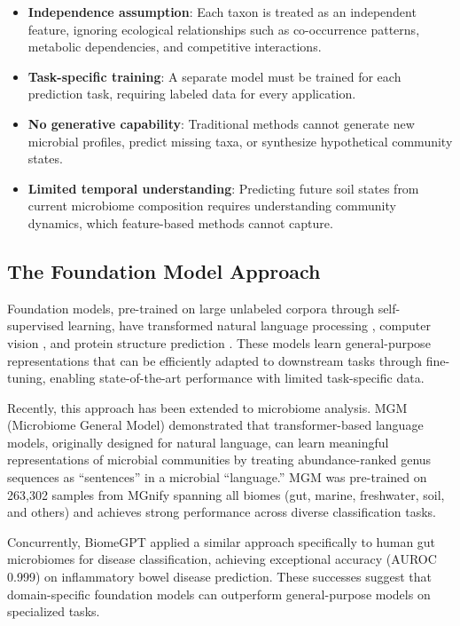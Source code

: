 \documentclass[11pt,a4paper]{article}
\begin{document}
\begin{itemize}[leftmargin=1.5em]
    \item \textbf{Independence assumption}: Each taxon is treated as an independent feature, ignoring ecological relationships such as co-occurrence patterns, metabolic dependencies, and competitive interactions.
    \item \textbf{Task-specific training}: A separate model must be trained for each prediction task, requiring labeled data for every application.
    \item \textbf{No generative capability}: Traditional methods cannot generate new microbial profiles, predict missing taxa, or synthesize hypothetical community states.
    \item \textbf{Limited temporal understanding}: Predicting future soil states from current microbiome composition requires understanding community dynamics, which feature-based methods cannot capture.
\end{itemize}

\subsection{The Foundation Model Approach}

Foundation models, pre-trained on large unlabeled corpora through self-supervised learning, have transformed natural language processing \citep{brown2020language}, computer vision \citep{dosovitskiy2020image}, and protein structure prediction \citep{jumper2021highly}. These models learn general-purpose representations that can be efficiently adapted to downstream tasks through fine-tuning, enabling state-of-the-art performance with limited task-specific data.

Recently, this approach has been extended to microbiome analysis. MGM (Microbiome General Model) \citep{mgm2024} demonstrated that transformer-based language models, originally designed for natural language, can learn meaningful representations of microbial communities by treating abundance-ranked genus sequences as ``sentences'' in a microbial ``language.'' MGM was pre-trained on 263,302 samples from MGnify spanning all biomes (gut, marine, freshwater, soil, and others) and achieves strong performance across diverse classification tasks.

Concurrently, BiomeGPT applied a similar approach specifically to human gut microbiomes for disease classification, achieving exceptional accuracy (AUROC 0.999) on inflammatory bowel disease prediction. These successes suggest that domain-specific foundation models can outperform general-purpose models on specialized tasks.
\end{document}
